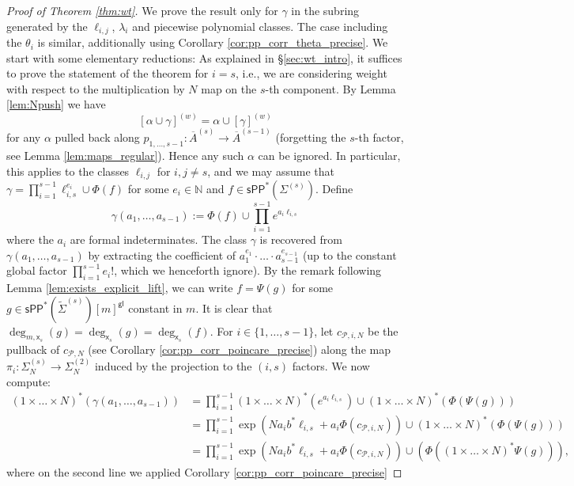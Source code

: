 \documentclass[11pt]{article}
\newcommand{\barA}{\overline{A}}
\newcommand{\sPP}{\mathsf{sPP}}
\newcommand{\spp}{\sPP}
\theoremstyle{definition}
\begin{document}
\begin{proof}[Proof of Theorem \ref{thm:wt}]
	We prove the result only for $\gamma$ in the subring generated by the $\ell_{i,j}$, $\lambda_i$ and piecewise polynomial classes.
	The case including the $\theta_i$ is similar, additionally using Corollary \ref{cor:pp_corr_theta_precise}.
	We start with some elementary reductions: As explained in \S\ref{sec:wt_intro}, it suffices to prove the statement of the theorem for $i=s$,
	i.e., we are considering weight with respect to the multiplication by $N$ map on the $s$-th component. By Lemma \ref{lem:Npush} we have
	$$[\alpha\cup \gamma]^{(w)}=\alpha\cup [\gamma]^{(w)}$$
	for any $\alpha$ pulled back along $p_{1, \ldots , s-1}:\barA^{(s)}\to \barA^{(s-1)}$ (forgetting the $s$-th factor, see Lemma \ref{lem:maps_regular}).
	Hence any such $\alpha$ can be ignored. In particular, this applies to the classes $\ell_{i,j}$ for $i,j\ne s$, and
	we may assume that $\gamma=\prod_{i=1}^{s-1}\ell_{i,s}^{e_i}\cup\Phi(f)$ for some $e_i\in \mathbb{N}$
	and $f\in \spp^{\ast}(\Sigma^{(s)})$. Define
	$$\gamma(a_1,\dots,a_{s-1}):=\Phi(f)\cup\prod_{i=1}^{s-1}e^{a_i\ell_{i,s}}$$
	where the $a_i$ are formal indeterminates. The class $\gamma$ is recovered
	from $\gamma(a_1,\dots,a_{s-1})$ by extracting the coefficient of $a_1^{e_1}\cdot\dots\cdot a_{s-1}^{e_{s-1}}$
	(up to the constant global factor $\prod_{i=1}^{s-1}e_i!$, which we henceforth ignore).
	By the remark
	following Lemma \ref{lem:exists_explicit_lift}, we can
	write $f=\Psi(g)$ for some
	$g\in \spp^{\ast}(\tilde{\Sigma}^{(s)})[m]^{\mathsf{gl}}$ constant
	in $m$. It is clear that $\deg_{m,\mathsf{x}_s}(g)=\deg_{\mathsf{x}_s}(g)=\deg_{\mathsf{x}_s}(f)$.
	For $i\in \{1,\dots,s-1\}$, let $c_{\mathcal P,i,N}$ be the pullback
	of $c_{\mathcal P,N}$ (see Corollary \ref{cor:pp_corr_poincare_precise})
	along the map $\pi_i:\Sigma_N^{(s)}\to \Sigma_N^{(2)}$ induced by
	the projection to the $(i,s)$ factors.
	We now compute:
	\begin{align*}
		(1\times \dots\times N)^{\ast}(\gamma(a_1,\dots,a_{s-1}))&=\prod_{i=1}^{s-1}(1\times \dots\times N)^{\ast}(e^{a_i\ell_{i,s}})\cup(1\times \dots\times N)^{\ast}(\Phi(\Psi(g)))\\
		&=\prod_{i=1}^{s-1}\exp(Na_ib^{\ast}\ell_{i,s}+a_i\Phi(c_{\mathcal P,i,N}))\cup(1\times \dots\times N)^{\ast}(\Phi(\Psi(g)))\\
		&=\prod_{i=1}^{s-1}\exp(Na_ib^{\ast}\ell_{i,s}+a_i\Phi(c_{\mathcal P,i,N}))\cup(\Phi((1\times \dots\times N)^{\ast}\Psi(g))),
	\end{align*}
	where on the second line we applied Corollary \ref{cor:pp_corr_poincare_precise}

\end{proof}
\end{document}
